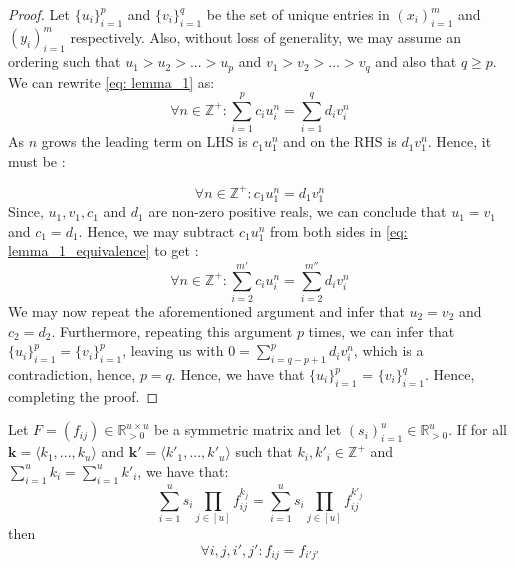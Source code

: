   \begin{proof}Let $\{u_{i}\}^{p}_{i=1}$ and  $\{v_{i}\}^{q}_{i=1}$ be the set of unique entries in $(x_i)^{m}_{i=1}$ and $(y_i)^{m}_{i=1}$ respectively. Also, without loss of generality, we may assume an ordering such that $u_1 > u_2> ... >u_{p} $ and $v_1 > v_2> ...>v_{q} $ and also that $q\geq p $. We can rewrite \eqref{eq: lemma_1} as:
  \begin{equation}
    \label{eq: lemma_1_equivalence}
   \forall n \in \mathbb{Z^{+}}:  \sum_{i=1}^{p}c_iu_i^{n} = \sum_{i=1}^{q}d_iv_i^{n} 
  \end{equation}
  As $n$ grows the leading term on LHS is $c_1u_{1}^{n}$ and on the RHS is $d_1v_{1}^{n}$. Hence, it must be :
  
  \begin{equation*}
    \forall n \in \mathbb{Z^{+}}: c_1 u_{1}^{n}  = d_1 v_{1}^{n} 
  \end{equation*}
  Since, $u_1,v_1,c_1$ and $d_1$ are non-zero positive reals, we can conclude that $u_1=v_1$ and $c_1 = d_1$. Hence, we may subtract $c_1 u_{1}^{n}$ from both sides in \eqref{eq: lemma_1_equivalence} to get :
  \begin{equation}
    \label{eq: lemma_1_equivalence_1}
   \forall n \in \mathbb{Z^{+}}:  \sum_{i=2}^{m'}c_iu_i^{n} = \sum_{i=2}^{m''}d_iv_i^{n} 
  \end{equation}
  We may now repeat the aforementioned argument and infer that $u_2=v_2$ and $c_2 = d_2$. Furthermore, repeating this argument $p$ times, we can infer that $\{u_i\}^{p}_{i=1} = \{v_i\}^{p}_{i=1}$, leaving us with $0 =\sum_{i=q-p+1}^{p}d_iv_i^{n}$, which is a contradiction, hence, $p=q$. Hence, we have that $\{u_{i}\}^{p}_{i=1}$ = $\{v_{i}\}^{q}_{i=1}$. Hence, completing the proof.
  \end{proof}
  
  
  \begin{lemma}
    \label{lemma_2}
  Let $F = (f_{ij}) \in \mathbb{R}_{>0}^{u \times u}$ be a symmetric matrix and let $(s_i)^{u}_{i=1} \in \mathbb{R}_{>0}^{u}$. If for all $\bm{k} = \langle k_1,...,k_u \rangle$ and $\bm{k'} = \langle k'_1,...,k'_u \rangle $ such that $k_i,k'_i \in \mathbb{Z^{+}}$ and $\sum_{i=1}^{u}k_i = \sum_{i=1}^{u}k'_i$, we have that: 
    \begin{equation}
      \label{eq: lemma_2}
  \sum_{i=1}^{u}s_i\prod_{j\in [u]}f_{ij}^{k_{j}} = \sum_{i=1}^{u}s_i\prod_{j\in [u]}f_{ij}^{k'_{j}}
    \end{equation}
  then 
  \begin{equation*}
    \forall i,j,i',j' : f_{ij} = f_{i'j'}
  \end{equation*}
  \end{lemma}
  
